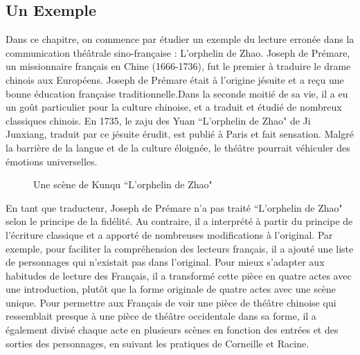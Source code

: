 \documentclass[UTF8,a4paper,12pt]{ctexart}
\numberwithin{equation}{section}
\newcommand{\mycite}[1]{\cite{#1}}
\begin{document}
\subsection{Un Exemple} \label{sec:exemple}
Dans ce chapitre, on commence par étudier un exemple du lecture erronée dans la communication théâtrale sino-française : L'orphelin de Zhao. Joseph de Prémare, un missionnaire français en Chine (1666-1736), fut le premier à traduire le drame chinois aux Européens. Joseph de Prémare était à l'origine jésuite et a reçu une bonne éducation française traditionnelle.Dans la seconde moitié de sa vie, il a eu un goût particulier pour la culture chinoise, et a traduit et étudié de nombreux classiques chinois. En 1735, le zaju des Yuan ``L'orphelin de Zhao" de Ji Junxiang, traduit par ce jésuite érudit, est publié à Paris et fait sensation\mycite{77}. Malgré la barrière de la langue et de la culture éloignée, le théâtre pourrait véhiculer des émotions universelles. 

\begin{figure}[H] 
\caption{ Une scène de Kunqu ``L'orphelin de Zhao"}
\end{figure}

En tant que traducteur, Joseph de Prémare n'a pas traité ``L'orphelin de Zhao" selon le principe de la fidélité. Au contraire, il a interprété à partir du principe de l'écriture classique et a apporté de nombreuses modifications à l'original. Par exemple, pour faciliter la compréhension des lecteurs français, il a ajouté une liste de personnages qui n'existait pas dans l'original. Pour mieux s'adapter aux habitudes de lecture des Français, il a transformé cette pièce en quatre actes avec une introduction, plutôt que la forme originale de quatre actes avec une scène unique. Pour permettre aux Français de voir une pièce de théâtre chinoise qui ressemblait presque à une pièce de théâtre occidentale dans sa forme, il a également divisé chaque acte en plusieurs scènes en fonction des entrées et des sorties des personnages, en suivant les pratiques de Corneille et Racine. 
\end{document}

